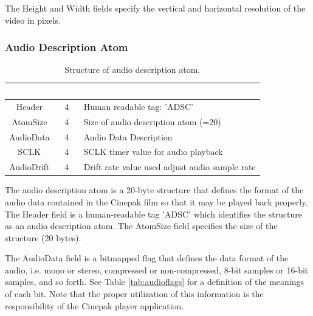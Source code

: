 \documentclass[12pt,letterpaper,twoside]{article}
\newcommand{\tabheadtxt}[1]{\multicolumn{1}{c}{\textcolor{white}{\textbf{#1}}}}
\begin{document}
The Height and Width fields specify the vertical and horizontal resolution of the video in pixels. 

\subsubsection{Audio Description Atom}

\begin{table}[h]
\centering
\begin{tabular}{|c|c|p{8cm}|}
\hline
\rowcolor{black}
\tabheadtxt{Field} & \tabheadtxt{Size} & \tabheadtxt{Description} \\
\hline
Header & 4 & Human readable tag: 'ADSC'\\
\hline
AtomSize & 4 & Size of audio description atom (=20)\\
\hline
AudioData & 4 & Audio Data Description\\
\hline
SCLK & 4 & SCLK timer value for audio playback\\
\hline
AudioDrift & 4 & Drift rate value used adjust audio sample rate\\
\hline
\end{tabular}
\caption{Structure of audio description atom.}
\label{tab:audiodesc}
\end{table}
\FloatBarrier

The audio description atom is a 20-byte structure that defines the format of the audio data contained in the Cinepak film so that it may be played back properly. The Header field is a human-readable tag 'ADSC' which identifies the structure as an audio description atom. The AtomSize field specifies the size of the structure (20 bytes).

The AudioData field is a bitmapped flag that defines the data format of the audio, i.e. mono or stereo, compressed or non-compressed, 8-bit samples or 16-bit samples, and so forth. See Table \ref{tab:audioflags} for a definition of the meanings of each bit. Note that the proper utilization of this information is the responsibility of the Cinepak player application. 
\end{document}
